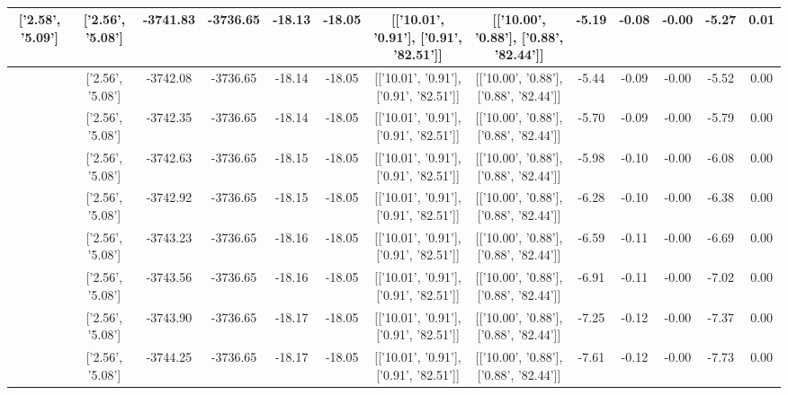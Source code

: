 \begin{table}[htbp]
\begin{adjustbox}{angle=90}
\begin{tabular}{|c|c|c|c|c|c|c|c|c|c|c|c|c|}
 ['2.58', '5.09'] & ['2.56', '5.08'] & -3741.83 & -3736.65 & -18.13 & -18.05 & [['10.01', '0.91'], ['0.91', '82.51']] & [['10.00', '0.88'], ['0.88', '82.44']] & -5.19 & -0.08 & -0.00 & -5.27 & 0.01\\ \hline
 ['2.58', '5.09'] & ['2.56', '5.08'] & -3742.08 & -3736.65 & -18.14 & -18.05 & [['10.01', '0.91'], ['0.91', '82.51']] & [['10.00', '0.88'], ['0.88', '82.44']] & -5.44 & -0.09 & -0.00 & -5.52 & 0.00\\ \hline
 ['2.58', '5.09'] & ['2.56', '5.08'] & -3742.35 & -3736.65 & -18.14 & -18.05 & [['10.01', '0.91'], ['0.91', '82.51']] & [['10.00', '0.88'], ['0.88', '82.44']] & -5.70 & -0.09 & -0.00 & -5.79 & 0.00\\ \hline
 ['2.59', '5.09'] & ['2.56', '5.08'] & -3742.63 & -3736.65 & -18.15 & -18.05 & [['10.01', '0.91'], ['0.91', '82.51']] & [['10.00', '0.88'], ['0.88', '82.44']] & -5.98 & -0.10 & -0.00 & -6.08 & 0.00\\ \hline
 ['2.59', '5.09'] & ['2.56', '5.08'] & -3742.92 & -3736.65 & -18.15 & -18.05 & [['10.01', '0.91'], ['0.91', '82.51']] & [['10.00', '0.88'], ['0.88', '82.44']] & -6.28 & -0.10 & -0.00 & -6.38 & 0.00\\ \hline
 ['2.59', '5.09'] & ['2.56', '5.08'] & -3743.23 & -3736.65 & -18.16 & -18.05 & [['10.01', '0.91'], ['0.91', '82.51']] & [['10.00', '0.88'], ['0.88', '82.44']] & -6.59 & -0.11 & -0.00 & -6.69 & 0.00\\ \hline
 ['2.59', '5.09'] & ['2.56', '5.08'] & -3743.56 & -3736.65 & -18.16 & -18.05 & [['10.01', '0.91'], ['0.91', '82.51']] & [['10.00', '0.88'], ['0.88', '82.44']] & -6.91 & -0.11 & -0.00 & -7.02 & 0.00\\ \hline
 ['2.59', '5.09'] & ['2.56', '5.08'] & -3743.90 & -3736.65 & -18.17 & -18.05 & [['10.01', '0.91'], ['0.91', '82.51']] & [['10.00', '0.88'], ['0.88', '82.44']] & -7.25 & -0.12 & -0.00 & -7.37 & 0.00\\ \hline
 ['2.59', '5.09'] & ['2.56', '5.08'] & -3744.25 & -3736.65 & -18.17 & -18.05 & [['10.01', '0.91'], ['0.91', '82.51']] & [['10.00', '0.88'], ['0.88', '82.44']] & -7.61 & -0.12 & -0.00 & -7.73 & 0.00\\ \hline
            \end{tabular}
        \end{adjustbox}
        \caption{}
        \label{}
    \end{table}
    